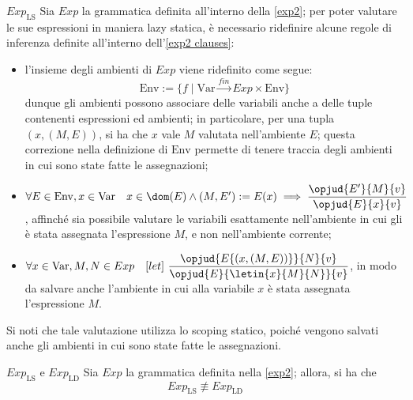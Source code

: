 \documentclass[a4paper, 12pt]{report}
\begin{document}
    \begin{framedprop}{$Exp_\mathrm{LS}$}
        Sia $Exp$ la grammatica definita all'interno della \cref{exp2}; per poter valutare le sue espressioni in maniera lazy statica, è necessario ridefinire alcune regole di inferenza definite all'interno dell'\cref{exp2 clauses}:

        \begin{itemize}
            \item l'insieme degli ambienti di $Exp$ viene ridefinito come segue: $$\mathrm{Env} := \{f \mid \mathrm{Var} \xrightarrow{fin} Exp \times \mathrm{Env} \}$$ dunque gli ambienti possono associare delle variabili anche a delle tuple contenenti espressioni ed ambienti; in particolare, per una tupla $(x, (M, E))$, si ha che $x$ vale $M$ valutata nell'ambiente $E$; questa correzione nella definizione di $\mathrm{Env}$ permette di tenere traccia degli ambienti in cui sono state fatte le assegnazioni;
            \item $\forall E \in \mathrm{Env}, x \in \mathrm{Var} \quad x \in \dom(E) \land (M, E') := E(x) \implies \dfrac{\opjud{E'}{M}{v}}{\opjud{E}{x}{v}}$, affinché sia possibile valutare le variabili esattamente nell'ambiente in cui gli è stata assegnata l'espressione $M$, e non nell'ambiente corrente;
            \item $\forall x \in \mathrm{Var}, M, N \in Exp \quad [let] \ \dfrac{\opjud{E\{(x, (M, E))\}}{N}{v}}{\opjud{E}{\letin{x}{M}{N}}{v}}$, in modo da salvare anche l'ambiente in cui alla variabile $x$ è stata assegnata l'espressione $M$.
        \end{itemize}

        Si noti che tale valutazione utilizza lo scoping statico, poiché vengono salvati anche gli ambienti in cui sono state fatte le assegnazioni.
    \end{framedprop}

    \begin{framedlem}{$Exp_\mathrm{LS}$ e $Exp_\mathrm{LD}$}
        Sia $Exp$ la grammatica definita nella \cref{exp2}; allora, si ha che $$Exp_\mathrm{LS} \not\equiv Exp_\mathrm{LD}$$
    \end{framedlem}
\end{document}
